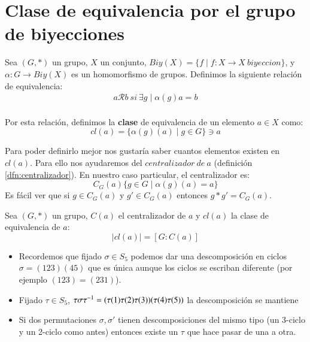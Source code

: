 
\section{Clase de equivalencia por el grupo de biyecciones}
\begin{dfn}
	Sea $(G, \ast)$ un grupo, $X$ un conjunto, $Biy(X) = \{f\mid f: X\longrightarrow X\ biyeccion\}$, y $\alpha: G \longrightarrow Biy(X)$ es un homomorfismo de grupos. Definimos la siguiente relación de equivalencia:
	\begin{align*}
	a\mathcal{R}b\ si\ \exists g \mid \alpha(g)a=b
	\end{align*}\\
	Por esta relación, definimos la \textbf{clase} de equivalencia de un elemento $a \in X$ como:  \[cl(a)=\{ \alpha(g)(a)\mid g\in G \} \ni a \]
\end{dfn}
Para poder definirlo mejor nos gustaría saber cuantos elementos existen en $cl(a)$. Para ello nos ayudaremos del $centralizador\ de\ a$ (definición \ref{dfn:centralizador}). En nuestro caso particular, el centralizador es:
\[ C_G(a) \{g\in G \mid \alpha(g)(a) = a \} \]
Es fácil ver que si $g \in C_G(a)$ y $g' \in C_G(a)$ entonces $g \ast g' = C_G(a)$.
\begin{thm}
	Sea $(G, \ast)$ un grupo, $C(a)$ el centralizador de $a$ y $cl(a)$ la clase de equivalencia de $a$:
	\[ |cl(a)| = \left[ G:C(a) \right] \]
\end{thm}
\begin{itemize}
	\item Recordemos que fijado $\sigma \in S_5$ podemos dar una descomposición en ciclos $\sigma = (123)(45)$ que es única aunque los ciclos se escriban diferente (por ejemplo $(123) = (231)$).
	
	\item Fijado $\tau \in S_5$, $\tau \sigma \tau^{-1} = (\tau(1)\tau(2)\tau(3))(\tau(4)\tau(5))$ la descomposición se mantiene
	
	\item Si dos permutaciones $\sigma, \sigma'$ tienen descomposiciones del mismo tipo (un 3-ciclo y un 2-ciclo como antes) entonces existe un $\tau$ que hace pasar de una a otra.
\end{itemize}

